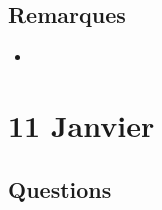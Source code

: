 \documentclass[a4paper, 11pt, hidelinks]{article}
\begin{document}
\subsection{Remarques}



\begin{itemize}
    \item 
\end{itemize}







\section{11 Janvier}



\subsection{Questions}
\end{document}
